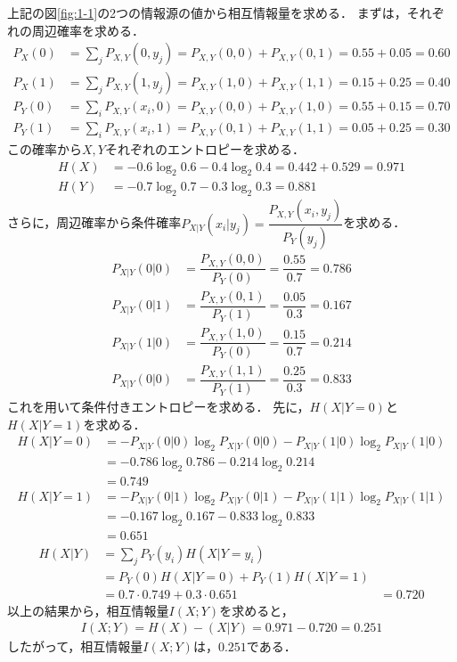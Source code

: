 \documentclass[documentclass]{jsarticle}
\begin{document}
上記の図\ref*{fig:1-1}の2つの情報源の値から相互情報量を求める．
まずは，それぞれの周辺確率を求める．
\begin{align*}
  P_X(0) &= \sum_j P_{X, Y}(0, y_j) = P_{X, Y}(0, 0) + P_{X, Y}(0, 1) = 0.55 + 0.05 = 0.60\\
  P_X(1) &= \sum_j P_{X, Y}(1, y_j) = P_{X, Y}(1, 0) + P_{X, Y}(1, 1) = 0.15 + 0.25 = 0.40\\
  P_Y(0) &= \sum_i P_{X, Y}(x_i, 0) = P_{X, Y}(0, 0) + P_{X, Y}(1, 0) = 0.55 + 0.15 = 0.70\\
  P_Y(1) &= \sum_i P_{X, Y}(x_i, 1) = P_{X, Y}(0, 1) + P_{X, Y}(1, 1) = 0.05 + 0.25 = 0.30  
\end{align*}
この確率から$X, Y$それぞれのエントロピーを求める．
\begin{align*}
  H(X) &= -0.6\log_2{0.6} - 0.4\log_2{0.4} = 0.442 + 0.529 = 0.971\\
  H(Y) &= -0.7\log_2{0.7} - 0.3\log_2{0.3} = 0.881
\end{align*}
さらに，周辺確率から条件確率$P_{X|Y}(x_i|y_j)=\dfrac{P_{X,Y}(x_i,y_j)}{P_Y(y_j)}$を求める．
\begin{align*}
  P_{X|Y}(0|0) &= \dfrac{P_{X,Y}(0,0)}{P_Y(0)}= \dfrac{0.55}{0.7} = 0.786\\
  P_{X|Y}(0|1) &= \dfrac{P_{X,Y}(0,1)}{P_Y(1)}= \dfrac{0.05}{0.3} = 0.167\\
  P_{X|Y}(1|0) &= \dfrac{P_{X,Y}(1,0)}{P_Y(0)}= \dfrac{0.15}{0.7} = 0.214\\
  P_{X|Y}(0|0) &= \dfrac{P_{X,Y}(1,1)}{P_Y(1)}= \dfrac{0.25}{0.3} = 0.833
\end{align*}
これを用いて条件付きエントロピーを求める．
先に，$H(X|Y=0)$と$H(X|Y=1)$を求める．
\begin{align*}
  H(X|Y=0) &= -P_{X|Y}(0|0) \log_2 P_{X|Y}(0|0) - P_{X|Y}(1|0) \log_2 P_{X|Y}(1|0)\\
  &= -0.786 \log_2 0.786 - 0.214 \log_2 0.214\\
  &= 0.749\\
  H(X|Y=1) &= -P_{X|Y}(0|1) \log_2 P_{X|Y}(0|1) - P_{X|Y}(1|1) \log_2 P_{X|Y}(1|1)\\
  &= -0.167 \log_2 0.167 - 0.833 \log_2 0.833\\
  &= 0.651
\end{align*}
\begin{align*}
  H(X|Y) &= \sum_j P_Y(y_i)H(X|Y=y_i)\\
  &= P_Y(0)H(X|Y=0) + P_Y(1)H(X|Y=1)\\
  &= 0.7 \cdot 0.749 + 0.3 \cdot 0.651
  &= 0.720
\end{align*}
以上の結果から，相互情報量$I(X;Y)$を求めると，
\begin{align*}
  I(X;Y) = H(X) - (X|Y) = 0.971 - 0.720 = 0.251
\end{align*}
したがって，相互情報量$I(X;Y)$は，$0.251$である．
\newpage
\end{document}
